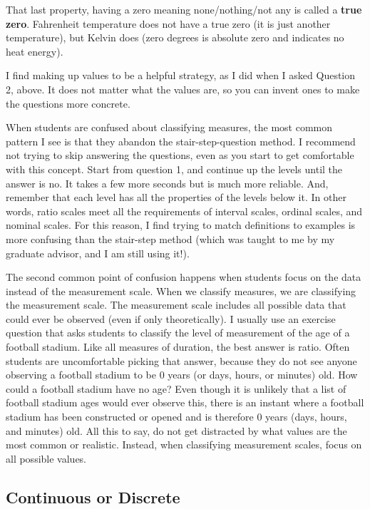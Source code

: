 \documentclass[
]{book}
\begin{document}
That last property, having a zero meaning none/nothing/not any is called a \textbf{true zero}. Fahrenheit temperature does not have a true zero (it is just another temperature), but Kelvin does (zero degrees is absolute zero and indicates no heat energy).

I find making up values to be a helpful strategy, as I did when I asked Question 2, above. It does not matter what the values are, so you can invent ones to make the questions more concrete.

When students are confused about classifying measures, the most common pattern I see is that they abandon the stair-step-question method. I recommend not trying to skip answering the questions, even as you start to get comfortable with this concept. Start from question 1, and continue up the levels until the answer is no. It takes a few more seconds but is much more reliable. And, remember that each level has all the properties of the levels below it. In other words, ratio scales meet all the requirements of interval scales, ordinal scales, and nominal scales. For this reason, I find trying to match definitions to examples is more confusing than the stair-step method (which was taught to me by my graduate advisor, and I am still using it!).

The second common point of confusion happens when students focus on the data instead of the measurement scale. When we classify measures, we are classifying the measurement scale. The measurement scale includes all possible data that could ever be observed (even if only theoretically). I usually use an exercise question that asks students to classify the level of measurement of the age of a football stadium. Like all measures of duration, the best answer is ratio. Often students are uncomfortable picking that answer, because they do not see anyone observing a football stadium to be 0 years (or days, hours, or minutes) old. How could a football stadium have no age? Even though it is unlikely that a list of football stadium ages would ever observe this, there is an instant where a football stadium has been constructed or opened and is therefore 0 years (days, hours, and minutes) old. All this to say, do not get distracted by what values are the most common or realistic. Instead, when classifying measurement scales, focus on all possible values.

\hypertarget{continuous-or-discrete}{%
\subsection{Continuous or Discrete}\label{continuous-or-discrete}}
\end{document}
